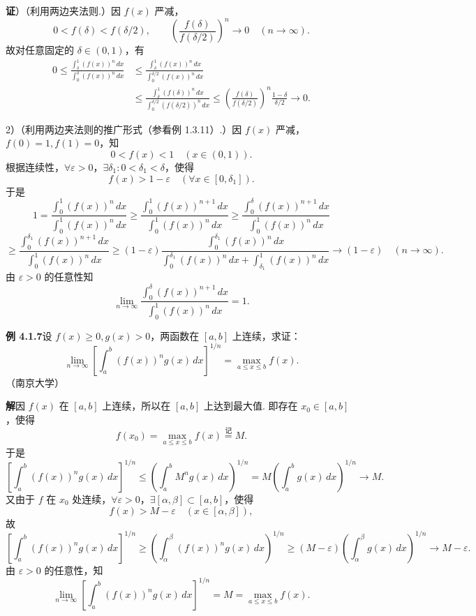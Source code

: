\documentclass[UTF8,12pt,a4paper,fontset=fandol]{ctexart}
\begin{document}
\noindent\textbf{证}）（利用两边夹法则.）因 $f(x)$ 严减，
\[
0<f(\delta)<f(\delta/2),\qquad
\left(\frac{f(\delta)}{f(\delta/2)}\right)^n\to0\quad(n\to\infty).
\]
故对任意固定的 $\delta\in(0,1)$，有
\[
\begin{aligned}
0\le\frac{\displaystyle\int_\delta^1(f(x))^n\,dx}
{\displaystyle\int_0^\delta(f(x))^n\,dx}
&\le
\frac{\displaystyle\int_\delta^1(f(x))^n\,dx}
{\displaystyle\int_0^{\delta/2}(f(x))^n\,dx}\\
&\le
\frac{\displaystyle\int_\delta^1(f(\delta))^n\,dx}
{\displaystyle\int_0^{\delta/2}(f(\delta/2))^n\,dx}
\le
\left(\frac{f(\delta)}{f(\delta/2)}\right)^n\frac{1-\delta}{\delta/2}\to0.
\end{aligned}
\]

2）（利用两边夹法则的推广形式（参看例 1.3.11）.）因 $f(x)$ 严减，$f(0)=1,f(1)=0$，知
\[
0<f(x)<1\quad(x\in(0,1)).
\]
根据连续性，$\forall\varepsilon>0$，$\exists\delta_1:0<\delta_1<\delta$，使得
\[
f(x)>1-\varepsilon\quad(\forall x\in[0,\delta_1]).
\]
于是
\[
1=\frac{\displaystyle\int_0^1(f(x))^n\,dx}
{\displaystyle\int_0^1(f(x))^n\,dx}
\ge
\frac{\displaystyle\int_0^1(f(x))^{n+1}\,dx}
{\displaystyle\int_0^1(f(x))^n\,dx}
\ge
\frac{\displaystyle\int_0^\delta(f(x))^{n+1}\,dx}
{\displaystyle\int_0^1(f(x))^n\,dx}
\]
\[
\ge
\frac{\displaystyle\int_0^{\delta_1}(f(x))^{n+1}\,dx}
{\displaystyle\int_0^1(f(x))^n\,dx}
\ge
(1-\varepsilon)
\frac{\displaystyle\int_0^{\delta_1}(f(x))^n\,dx}
{\displaystyle\int_0^{\delta_1}(f(x))^n\,dx+
\displaystyle\int_{\delta_1}^1(f(x))^n\,dx}
\to(1-\varepsilon)\quad(n\to\infty).
\]
由 $\varepsilon>0$ 的任意性知
\[
\lim_{n\to\infty}
\frac{\displaystyle\int_0^\delta(f(x))^{n+1}\,dx}
{\displaystyle\int_0^1(f(x))^n\,dx}=1.
\]

\noindent\textbf{例 4.1.7}\quad 设 $f(x)\ge0,g(x)>0$，两函数在 $[a,b]$ 上连续，求证：
\[
\lim_{n\to\infty}
\left[\int_a^b(f(x))^n g(x)\,dx\right]^{1/n}
=\max_{a\le x\le b}f(x).
\]
（南京大学）

\noindent\textbf{解}\quad 因 $f(x)$ 在 $[a,b]$ 上连续，所以在 $[a,b]$ 上达到最大值. 即存在 $x_0\in[a,b]$，使得
\[
f(x_0)=\max_{a\le x\le b}f(x)\stackrel{\text{记}}{=}M.
\]
于是
\[
\left[\int_a^b(f(x))^n g(x)\,dx\right]^{1/n}
\le \left(\int_a^b M^n g(x)\,dx\right)^{1/n}
=M\left(\int_a^b g(x)\,dx\right)^{1/n}\to M.
\]
又由于 $f$ 在 $x_0$ 处连续，$\forall\varepsilon>0$，$\exists[\alpha,\beta]\subset[a,b]$，使得
\[
f(x)>M-\varepsilon\quad(x\in[\alpha,\beta]),
\]
故
\[
\left[\int_a^b(f(x))^n g(x)\,dx\right]^{1/n}
\ge \left(\int_\alpha^\beta(f(x))^n g(x)\,dx\right)^{1/n}
\ge (M-\varepsilon)\left(\int_\alpha^\beta g(x)\,dx\right)^{1/n}
\to M-\varepsilon.
\]
由 $\varepsilon>0$ 的任意性，知
\[
\lim_{n\to\infty}
\left[\int_a^b(f(x))^n g(x)\,dx\right]^{1/n}
=M=\max_{a\le x\le b}f(x).
\]
\end{document}
